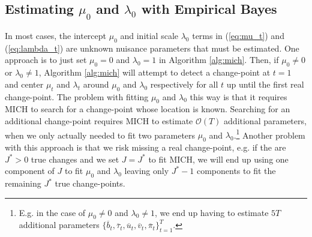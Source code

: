 \subsection{Estimating \texorpdfstring{$\mu_0$}{mu0} and \texorpdfstring{$\lambda_0$}{lambda0} with Empirical Bayes}
\label{app:empirical-bayes}

In most cases, the intercept $\mu_0$ and initial scale $\lambda_0$ terms in (\ref{eq:mu_t}) and (\ref{eq:lambda_t}) are unknown nuisance parameters that must be estimated. One approach is to just set $\mu_0 = 0$ and $\lambda_0 = 1$ in Algorithm \ref{alg:mich}. Then, if $\mu_0 \neq 0$ or $\lambda_0 \neq 1$, Algorithm \ref{alg:mich} will attempt to detect a change-point at $t=1$ and center $\mu_{t}$ and $\lambda_t$ around $\mu_0$ and $\lambda_0$ respectively for all $t$ up until the first real change-point. The problem with fitting $\mu_0$ and $\lambda_0$ this way is that it requires MICH to search for a change-point whose location is known. Searching for an additional change-point requires MICH to estimate  $\mathcal{O}(T)$ additional parameters, when we only actually needed to fit two parameters $\mu_0$ and $\lambda_0$.\footnote{E.g. in the case of $\mu_0 \neq 0$ and $\lambda_0 \neq 1$, we end up having to estimate $5T$ additional parameters $\{\overline{b}_t, \overline{\tau}_t, \overline{u}_t, \overline{v}_t, \overline{\pi}_t\}_{t=1}^T$.} Another problem with this approach is that we risk missing a real change-point, e.g. if the are $J^*>0$ true changes and we set $J=J^*$ to fit MICH, we will end up using one component of $J$ to fit $\mu_0$ and $\lambda_0$ leaving only $J^*-1$ components to fit the remaining $J^*$ true change-points. 

